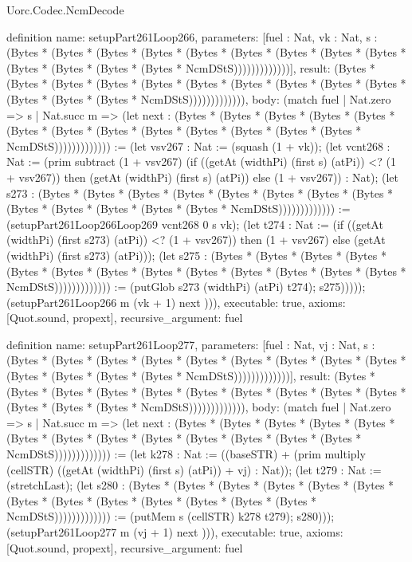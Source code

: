 \begin{lexlean}{Uorc.Codec.NcmDecode}
\begin{semanticmodule}
definition{
  name: setupPart261Loop266,
  parameters: [fuel : Nat, vk : Nat, s : (Bytes * (Bytes * (Bytes * (Bytes * (Bytes * (Bytes * (Bytes * (Bytes * (Bytes * (Bytes * (Bytes * (Bytes * (Bytes * NcmDStS)))))))))))))],
  result: (Bytes * (Bytes * (Bytes * (Bytes * (Bytes * (Bytes * (Bytes * (Bytes * (Bytes * (Bytes * (Bytes * (Bytes * (Bytes * NcmDStS))))))))))))),
  body: (match fuel
    | Nat.zero => s
    | Nat.succ m => (let next : (Bytes * (Bytes * (Bytes * (Bytes * (Bytes * (Bytes * (Bytes * (Bytes * (Bytes * (Bytes * (Bytes * (Bytes * (Bytes * NcmDStS))))))))))))) := (let vsv267 : Nat := (squash (1 + vk)); (let vcnt268 : Nat := (prim subtract (1 + vsv267) (if ((getAt (widthPi) (first s) (atPi)) <? (1 + vsv267)) then (getAt (widthPi) (first s) (atPi)) else (1 + vsv267)) : Nat); (let s273 : (Bytes * (Bytes * (Bytes * (Bytes * (Bytes * (Bytes * (Bytes * (Bytes * (Bytes * (Bytes * (Bytes * (Bytes * (Bytes * NcmDStS))))))))))))) := (setupPart261Loop266Loop269 vcnt268 0 s vk); (let t274 : Nat := (if ((getAt (widthPi) (first s273) (atPi)) <? (1 + vsv267)) then (1 + vsv267) else (getAt (widthPi) (first s273) (atPi))); (let s275 : (Bytes * (Bytes * (Bytes * (Bytes * (Bytes * (Bytes * (Bytes * (Bytes * (Bytes * (Bytes * (Bytes * (Bytes * (Bytes * NcmDStS))))))))))))) := (putGlob s273 (widthPi) (atPi) t274); s275))))); (setupPart261Loop266 m (vk + 1) next ))),
  executable: true,
  axioms: [Quot.sound, propext],
  recursive_argument: fuel
}

definition{
  name: setupPart261Loop277,
  parameters: [fuel : Nat, vj : Nat, s : (Bytes * (Bytes * (Bytes * (Bytes * (Bytes * (Bytes * (Bytes * (Bytes * (Bytes * (Bytes * (Bytes * (Bytes * (Bytes * NcmDStS)))))))))))))],
  result: (Bytes * (Bytes * (Bytes * (Bytes * (Bytes * (Bytes * (Bytes * (Bytes * (Bytes * (Bytes * (Bytes * (Bytes * (Bytes * NcmDStS))))))))))))),
  body: (match fuel
    | Nat.zero => s
    | Nat.succ m => (let next : (Bytes * (Bytes * (Bytes * (Bytes * (Bytes * (Bytes * (Bytes * (Bytes * (Bytes * (Bytes * (Bytes * (Bytes * (Bytes * NcmDStS))))))))))))) := (let k278 : Nat := ((baseSTR) + (prim multiply (cellSTR) ((getAt (widthPi) (first s) (atPi)) + vj) : Nat)); (let t279 : Nat := (stretchLast); (let s280 : (Bytes * (Bytes * (Bytes * (Bytes * (Bytes * (Bytes * (Bytes * (Bytes * (Bytes * (Bytes * (Bytes * (Bytes * (Bytes * NcmDStS))))))))))))) := (putMem s (cellSTR) k278 t279); s280))); (setupPart261Loop277 m (vj + 1) next ))),
  executable: true,
  axioms: [Quot.sound, propext],
  recursive_argument: fuel
}


\end{semanticmodule}
\end{lexlean}
